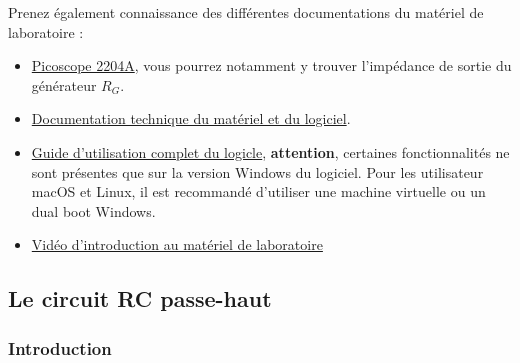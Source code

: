 \documentclass{../template/labo}
\begin{document}
Prenez également connaissance des différentes documentations du matériel de laboratoire : 
\begin{itemize}
	\item \href{https://www.picotech.com/oscilloscope/2000/picoscope-2000-specifications}{Picoscope 2204A}, vous pourrez notamment y trouver l'impédance de sortie du générateur $R_G$.
	\item \href{https://www.picotech.com/download/datasheets/picoscope-2000-series-data-sheet-fr.pdf}{Documentation technique du matériel et du logiciel}.
	\item \href{https://www.picotech.com/download/manuals/PicoScope6UserGuideFR.pdf}{Guide d'utilisation complet du logicle}, \textbf{attention}, certaines fonctionnalités ne sont présentes que sur la version Windows du logiciel. Pour les utilisateur macOS et Linux, il est recommandé d'utiliser une machine virtuelle ou un dual boot Windows.
	\item \href{https://www.youtube.com/watch?v=fg7peJT8xo0}{Vidéo d'introduction au matériel de laboratoire}
\end{itemize}



\subsection{Le circuit RC passe-haut}
\subsubsection{Introduction}
\end{document}
